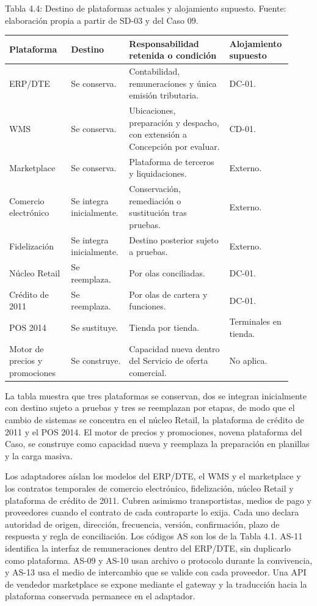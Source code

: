 \documentclass[11pt]{article}
\begin{document}
Tabla 4.4: Destino de plataformas actuales y alojamiento supuesto. Fuente: elaboración propia a partir de SD-03 y del Caso 09.\par\nopagebreak
\begin{longtable}{@{}p{0.212\linewidth}p{0.192\linewidth}p{0.346\linewidth}p{0.173\linewidth}@{}}
\toprule Plataforma & Destino & Responsabilidad retenida o condición & Alojamiento supuesto \\
\midrule\endhead\bottomrule\endlastfoot
ERP/DTE & Se conserva. & Contabilidad, remuneraciones y única emisión tributaria. & DC-01. \\
WMS & Se conserva. & Ubicaciones, preparación y despacho, con extensión a Concepción por evaluar. & CD-01. \\
Marketplace & Se conserva. & Plataforma de terceros y liquidaciones. & Externo. \\
Comercio electrónico & Se integra inicialmente. & Conservación, remediación o sustitución tras pruebas. & Externo. \\
Fidelización & Se integra inicialmente. & Destino posterior sujeto a pruebas. & Externo. \\
Núcleo Retail & Se reemplaza. & Por olas conciliadas. & DC-01. \\
Crédito de 2011 & Se reemplaza. & Por olas de cartera y funciones. & DC-01. \\
POS 2014 & Se sustituye. & Tienda por tienda. & Terminales en tienda. \\
Motor de precios y promociones & Se construye. & Capacidad nueva dentro del Servicio de oferta comercial. & No aplica. \\
\end{longtable}

La tabla muestra que tres plataformas se conservan, dos se integran inicialmente con destino sujeto a pruebas y tres se reemplazan por etapas, de modo que el cambio de sistemas se concentra en el núcleo Retail, la plataforma de crédito de 2011 y el POS 2014. El motor de precios y promociones, novena plataforma del Caso, se construye como capacidad nueva y reemplaza la preparación en planillas y la carga masiva.

Los adaptadores aíslan los modelos del ERP/DTE, el WMS y el marketplace y los contratos temporales de comercio electrónico, fidelización, núcleo Retail y plataforma de crédito de 2011. Cubren asimismo transportistas, medios de pago y proveedores cuando el contrato de cada contraparte lo exija. Cada uno declara autoridad de origen, dirección, frecuencia, versión, confirmación, plazo de respuesta y regla de conciliación. Los códigos AS son los de la Tabla 4.1. AS-11 identifica la interfaz de remuneraciones dentro del ERP/DTE, sin duplicarlo como plataforma. AS-09 y AS-10 usan archivo o protocolo durante la convivencia, y AS-13 usa el medio de intercambio que se valide con cada proveedor. Una API de vendedor marketplace se expone mediante el gateway y la traducción hacia la plataforma conservada permanece en el adaptador.
\end{document}
